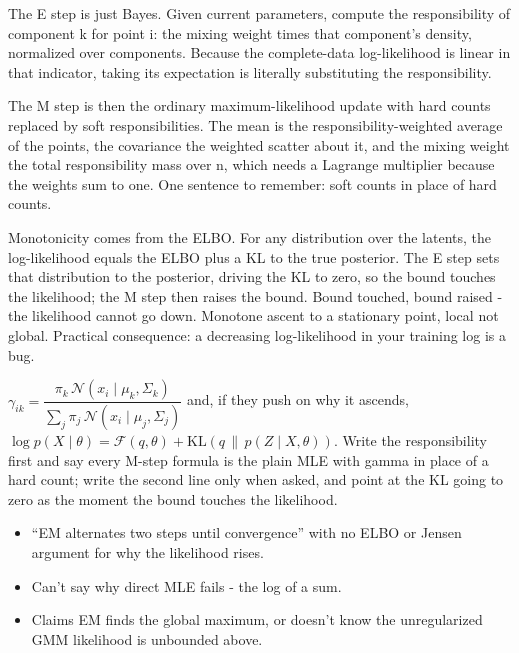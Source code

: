 \documentclass[10pt,twoside]{book}
\newcommand{\lab}[1]{\par\vspace{5pt}\noindent{\sffamily\footnotesize\bfseries\color{accent}#1}\par\vspace{1pt}}
\newcommand{\flab}[1]{\par\vspace{5pt}\noindent{\sffamily\footnotesize\bfseries\color{flag}#1}\par\vspace{1pt}}
\begin{document}
The E step is just Bayes. Given current parameters, compute the responsibility of component k for point i: the mixing weight times that component's density, normalized over components. Because the complete-data log-likelihood is linear in that indicator, taking its expectation is literally substituting the responsibility.\par\vspace{3pt}
The M step is then the ordinary maximum-likelihood update with hard counts replaced by soft responsibilities. The mean is the responsibility-weighted average of the points, the covariance the weighted scatter about it, and the mixing weight the total responsibility mass over n, which needs a Lagrange multiplier because the weights sum to one. One sentence to remember: soft counts in place of hard counts.\par\vspace{3pt}
Monotonicity comes from the ELBO. For any distribution over the latents, the log-likelihood equals the ELBO plus a KL to the true posterior. The E step sets that distribution to the posterior, driving the KL to zero, so the bound touches the likelihood; the M step then raises the bound. Bound touched, bound raised - the likelihood cannot go down. Monotone ascent to a stationary point, local not global. Practical consequence: a decreasing log-likelihood in your training log is a bug.\par\vspace{3pt}
\lab{If they hand you the marker}
$\gamma_{ik} = \dfrac{\pi_k\,\mathcal{N}(x_i \mid \mu_k, \Sigma_k)}{\sum_j \pi_j\,\mathcal{N}(x_i \mid \mu_j, \Sigma_j)}$ and, if they push on why it ascends, $\log p(X \mid \theta) = \mathcal{F}(q,\theta) + \mathrm{KL}\!\left(q \,\|\, p(Z \mid X, \theta)\right)$. Write the responsibility first and say every M-step formula is the plain MLE with gamma in place of a hard count; write the second line only when asked, and point at the KL going to zero as the moment the bound touches the likelihood.\par
\flab{Loses the signal}
\begin{itemize}
\item ``EM alternates two steps until convergence'' with no ELBO or Jensen argument for why the likelihood rises.
\item Can't say why direct MLE fails - the log of a sum.
\item Claims EM finds the global maximum, or doesn't know the unregularized GMM likelihood is unbounded above.
\end{itemize}
\end{document}
